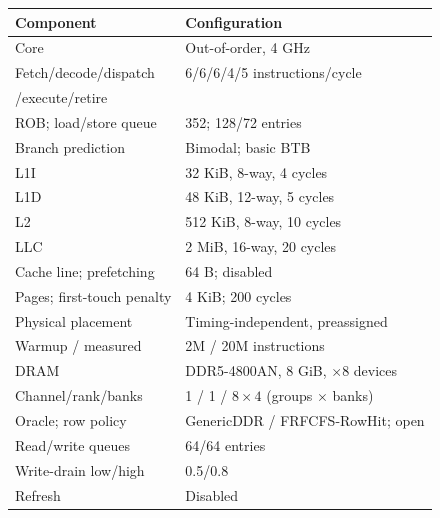 \begingroup\fontsize{7}{8}\selectfont\setlength{\tabcolsep}{3pt}\renewcommand{\arraystretch}{1.02}
\begin{tabular}{@{}p{}p{}@{}}\toprule
\textbf{Component} & \textbf{Configuration} \\\midrule
Core & Out-of-order, 4 GHz \\
Fetch/decode/dispatch & \mbox{6/6/6/4/5} instructions/cycle \\
\quad /execute/retire &  \\
ROB; load/store queue & 352; 128/72 entries \\
Branch prediction & Bimodal; basic BTB \\
L1I & 32 KiB, 8-way, 4 cycles \\
L1D & 48 KiB, 12-way, 5 cycles \\
L2 & 512 KiB, 8-way, 10 cycles \\
LLC & 2 MiB, 16-way, 20 cycles \\
Cache line; prefetching & 64 B; disabled \\
Pages; first-touch penalty & 4 KiB; 200 cycles \\
Physical placement & Timing-independent, preassigned \\
Warmup / measured & 2M / 20M instructions \\
\midrule
DRAM & DDR5-4800AN, 8 GiB, $\times$8 devices \\
Channel/rank/banks & 1 / 1 / $8\times4$ (groups $\times$ banks) \\
Oracle; row policy & GenericDDR / FRFCFS-RowHit; open \\
Read/write queues & 64/64 entries \\
Write-drain low/high & 0.5/0.8 \\
Refresh & Disabled \\
\bottomrule\end{tabular}\endgroup
